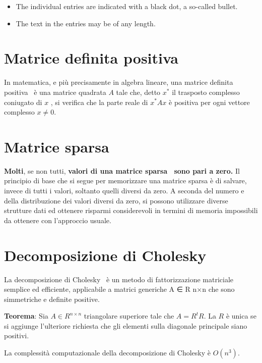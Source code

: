 \documentclass[a4paper,12pt,titlepage,oneside]{book}
\begin{document}
\begin{itemize}
  \item The individual entries are indicated with a black dot, a so-called bullet.
  \item The text in the entries may be of any length.
\end{itemize}


\section{Matrice definita positiva}
In matematica, e più precisamente in algebra lineare, una matrice definita positiva~\cite{matpos} è una matrice quadrata $A$ tale che, detto  $x^*$  il trasposto complesso coniugato di $x$ , si verifica che la parte reale di $x^*Ax$ è positiva per ogni vettore complesso \begin{math} x \neq 0\end{math}.


\section{Matrice sparsa}
\textbf{Molti}, se non tutti, \textbf{valori di una matrice sparsa~\cite{matspa} sono pari a zero.} 
Il principio di base che si segue per memorizzare una matrice sparsa è di salvare, invece di tutti i valori, soltanto quelli diversi da zero. A seconda del numero e della distribuzione dei valori diversi da zero, si possono utilizzare diverse strutture dati ed ottenere risparmi considerevoli in termini di memoria impossibili da ottenere con l'approccio usuale.


\section{Decomposizione di Cholesky}
La decomposizione di Cholesky~\cite{disp} è un metodo di fattorizzazione matriciale semplice ed efficiente, applicabile a matrici generiche A ∈ R n×n che sono simmetriche e definite positive.

\textbf{Teorema}: Sia \begin{math}A \in R^{n \times n} \end{math} triangolare superiore tale che \begin{math} A = R^{t}R \end{math}.
La $R$ è unica se si aggiunge l’ulteriore richiesta che gli elementi sulla diagonale principale siano positivi.

La complessità computazionale della decomposizione di Cholesky è \begin{math} O(n^3) \end{math}.
\end{document}
